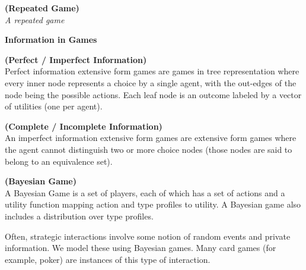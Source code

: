 \begin{defi}{\textbf{(Repeated Game)}}\\
\emph{A \emph{repeated game} } 
\end{defi}
\textbf{Information in Games}
\begin{defi}{\textbf{(Perfect / Imperfect Information)}}\\
Perfect information extensive form games are games in tree representation where every inner node represents
a choice by a single agent, with the out-edges of the node being the possible actions.
Each leaf node is an outcome labeled by a vector of utilities (one per agent).
\end{defi}
\begin{defi}{\textbf{(Complete / Incomplete Information)}}\\
An imperfect information extensive form games are extensive form games where the agent cannot distinguish
two or more choice nodes (those nodes are said to belong to an equivalence set).
\end{defi}

\begin{defi}{\textbf{(Bayesian Game)}}\\
A Bayesian Game is a set of players, each of which has a set of actions and a utility function mapping action and type profiles to utility. A Bayesian game also includes a distribution over type profiles.
\end{defi}

Often, strategic interactions involve some notion of random events and private information. We model these using Bayesian games. Many card games (for example, poker) are instances of this type of interaction.\\

